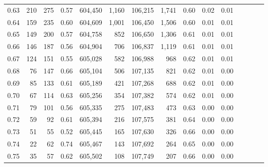 \begin{tabular}{rrrcrrrrrrrrrrr}
0.63 &     210 &    275 &                                       0.57 &  604,450 &    1,160 &  106,215 &    1,741 &  0.60 &  0.02 &                         0.01 \\
0.64 &     159 &    235 &                                       0.60 &  604,609 &    1,001 &  106,450 &    1,506 &  0.60 &  0.01 &                         0.01 \\
0.65 &     149 &    200 &                                       0.57 &  604,758 &      852 &  106,650 &    1,306 &  0.61 &  0.01 &                         0.01 \\
0.66 &     146 &    187 &                                       0.56 &  604,904 &      706 &  106,837 &    1,119 &  0.61 &  0.01 &                         0.01 \\
0.67 &     124 &    151 &                                       0.55 &  605,028 &      582 &  106,988 &      968 &  0.62 &  0.01 &                         0.01 \\
0.68 &      76 &    147 &                                       0.66 &  605,104 &      506 &  107,135 &      821 &  0.62 &  0.01 &                         0.00 \\
0.69 &      85 &    133 &                                       0.61 &  605,189 &      421 &  107,268 &      688 &  0.62 &  0.01 &                         0.00 \\
0.70 &      67 &    114 &                                       0.63 &  605,256 &      354 &  107,382 &      574 &  0.62 &  0.01 &                         0.00 \\
0.71 &      79 &    101 &                                       0.56 &  605,335 &      275 &  107,483 &      473 &  0.63 &  0.00 &                         0.00 \\
0.72 &      59 &     92 &                                       0.61 &  605,394 &      216 &  107,575 &      381 &  0.64 &  0.00 &                         0.00 \\
0.73 &      51 &     55 &                                       0.52 &  605,445 &      165 &  107,630 &      326 &  0.66 &  0.00 &                         0.00 \\
0.74 &      22 &     62 &                                       0.74 &  605,467 &      143 &  107,692 &      264 &  0.65 &  0.00 &                         0.00 \\
0.75 &      35 &     57 &                                       0.62 &  605,502 &      108 &  107,749 &      207 &  0.66 &  0.00 &                         0.00 \\

\end{tabular}
